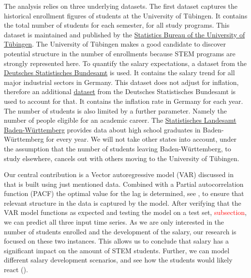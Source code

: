 \documentclass{article}
\theoremstyle{plain}
\theoremstyle{definition}
\theoremstyle{remark}
\begin{document}
The analysis relies on three underlying datasets.
The first dataset captures the historical enrollment figures of students at the University of Tübingen. 
It contains the total number of students for each semester, for all study programs. This dataset is maintained and published by the
\href{https://uni-tuebingen.de/einrichtungen/verwaltung/iv-studierende/studierendenabteilung/statistiken/}{Statistics Bureau of the University of Tübingen}.
The University of Tübingen makes a good candidate to discover potential structure in the number
of enrollments because STEM programs are strongly represented here. %
To quantify the salary expectations, a dataset from the \href{https://www-genesis.destatis.de/genesis//online?operation=table&code=62321-0001&bypass=true&levelindex=0&levelid=1702307320529#abreadcrumb}{Deutsches Statistisches Bundesamt} is used.
It contains the salary trend for all major industrial sectors in Germany. This dataset does not adjust for inflation,
therefore an additional \href{https://www-genesis.destatis.de/genesis//online?operation=table&code=61121-0001&bypass=true&levelindex=0&levelid=1706446467491#abreadcrumb}{dataset} from the Deutsches Statistisches Bundesamt is used to account for that. It contains the inflation rate in Germany for each year.
The number of students is also limited by a further parameter. Namely the number of people eligible for an academic career.
The \href{https://www.statistik-bw.de/BildungKultur/SchulenAllgem/LRt0302.jsp}{Statistisches Landesamt Baden-Württemberg} provides
data about high school graduates in Baden-Württemberg for every year. We will not take other states into account, under
the assumption that the number of students leaving Baden-Württemberg, to study elsewhere, cancels out with others moving to the University of Tübingen.

Our central contribution is a Vector autoregressive model (VAR) discussed in  that is built using just mentioned data. Combined with a
Partial autocorrelation function (PACF) the optimal value for the lag
is determined, see , to ensure that relevant structure in the data is captured by the model.
After verifying that the VAR model functions as expected and testing the model on a test set,  \textcolor{red}{subsection}, we
can predict all three input time series. As we are only interested in the number of students enrolled and the development of the salary, our research is 
focused on these two instances.
This allows us to conclude that salary has a significant impact on the amount of STEM students. Further, we can model different salary development scenarios, 
and see how the students would likely react ().
\end{document}
